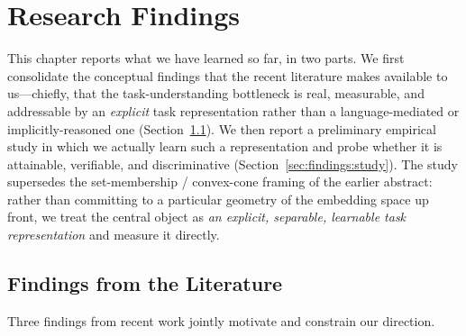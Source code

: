 %
%
%

\section{Research Findings}
\label{sec:findings}

This chapter reports what we have learned so far, in two parts. We first
consolidate the conceptual findings that the recent literature makes available
to us---chiefly, that the task-understanding bottleneck is real, measurable, and
addressable by an \emph{explicit} task representation rather than a
language-mediated or implicitly-reasoned one (Section~\ref{sec:findings:lit}).
We then report a preliminary empirical study in which we actually learn such a
representation and probe whether it is attainable, verifiable, and
discriminative (Section~\ref{sec:findings:study}). The study supersedes the
set-membership / convex-cone framing of the earlier abstract: rather than
committing to a particular geometry of the embedding space up front, we treat
the central object as \emph{an explicit, separable, learnable task
representation} and measure it directly.

\subsection{Findings from the Literature}
\label{sec:findings:lit}

Three findings from recent work jointly motivate and constrain our direction.

